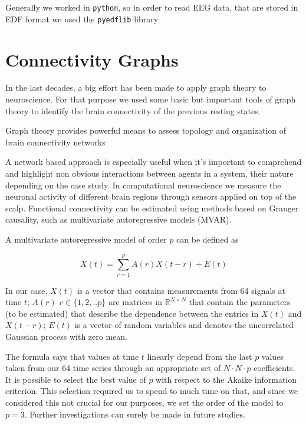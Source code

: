 \documentclass[%
 aip,
 jmp,%
 amsmath,amssymb,
 reprint,%
]{revtex4-1}
\begin{document}
Generally we worked in \verb|python|, so in order to read EEG data, that are stored in EDF format we used the \verb|pyedflib| library \cite{pyedflib}

\section{\label{sec:level1}Connectivity Graphs}

In the last decades, a big effort has been made to apply graph theory to neuroscience. For that purpose we used some basic but important tools of graph theory to identify the brain connectivity of the previous resting states.

Graph theory provides powerful means to assess topology and organization of brain connectivity networks

A network based approach is especially useful when it's important to comprehend and highlight non obvious interactions between agents in a system, their nature depending on the case study. In computational neuroscience we measure the neuronal activity of different brain regions through sensors applied on top of the scalp. Functional connectivity can be estimated using methods based on Granger causality, such as multivariate autoregressive models (MVAR).

A multivariate autoregressive model of order $p$ can be defined as 

\begin{equation}
	X(t) = \sum_{r = 1}^{p} A(r)X(t-r) + E(t)
\end{equation}

In our case, $X(t)$ is a vector that contains measurements from 64 signals at time $t$; $A(r)$ $r\in \{1,2,..p\}$ are matrices in $\mathbb{R}^{N\times N}$ that contain the parameters (to be estimated) that describe the dependence between the entries in $X(t)$ and $X(t-r)$; $E(t)$ is a vector of random variables and denotes the uncorrelated Gaussian process with zero mean.

The formula says that values at time $t$ linearly depend from the last $p$ values taken from our 64 time series through an appropriate set of $N \cdot N \cdot p$ coefficients.\\

It is possible to select the best value of $p$ with respect to the Akaike information criterion. This selection required us to spend to much time on that, and since we considered this not crucial for our purposes, we set the order of the model to $p = 3$. Further investigations can surely be made in future studies.\cite{DengfengHuang}\\
\end{document}
